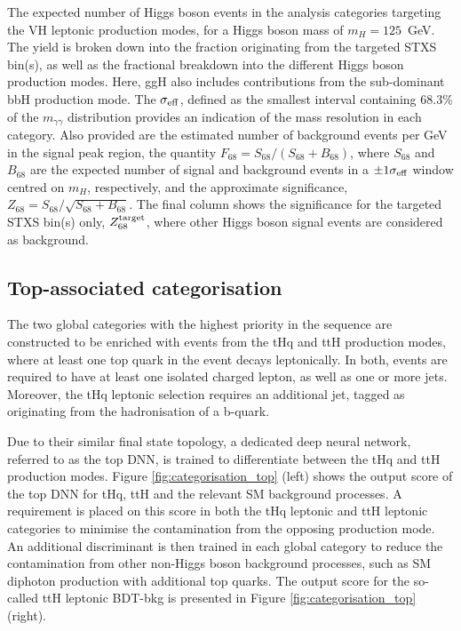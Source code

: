 \begin{table}[htb]
    \caption[Expected yields for the VH leptonic production mode categories]{The expected number of Higgs boson events in the analysis categories targeting the VH leptonic production modes, for a Higgs boson mass of $m_H=125$~GeV. The yield is broken down into the fraction originating from the targeted STXS bin(s), as well as the fractional breakdown into the different Higgs boson production modes. Here, ggH also includes contributions from the sub-dominant bbH production mode. The $\sigma_{\rm{eff}}$, defined as the smallest interval containing 68.3\% of the $m_{\gamma\gamma}$ distribution provides an indication of the mass resolution in each category. Also provided are the estimated number of background events per GeV in the signal peak region, the quantity $F_{68}=S_{68}/(S_{68}+B_{68})$, where $S_{68}$ and $B_{68}$ are the expected number of signal and background events in a $\pm1\sigma_{\rm{eff}}$ window centred on $m_H$, respectively, and the approximate significance, $Z_{68}=S_{68}/\sqrt{S_{68}+B_{68}}$. The final column shows the significance for the targeted STXS bin(s) only, $Z^{\rm{target}}_{68}$,  where other Higgs boson signal events are considered as background.}
    \label{tab:vhlep_category_yields}
    \centering
    \scriptsize
    \renewcommand{\arraystretch}{1.3}
    \setlength{\tabcolsep}{3pt}
    \hspace*{-1.5cm}
    
    \hspace*{-1.5cm}
\end{table}

\FloatBarrier

\subsection{Top-associated categorisation}
The two global categories with the highest priority in the sequence are constructed to be enriched with events from the tHq and ttH production modes, where at least one top quark in the event decays leptonically. In both, events are required to have at least one isolated charged lepton, as well as one or more jets. Moreover, the tHq leptonic selection requires an additional jet, tagged as originating from the hadronisation of a b-quark. 

Due to their similar final state topology, a dedicated deep neural network, referred to as the top DNN, is trained to differentiate between the tHq and ttH production modes. Figure \ref{fig:categorisation_top} (left) shows the output score of the top DNN for tHq, ttH and the relevant SM background processes. A requirement is placed on this score in both the tHq leptonic and ttH leptonic categories to minimise the contamination from the opposing production mode. An additional discriminant is then trained in each global category to reduce the contamination from other non-Higgs boson background processes, such as SM diphoton production with additional top quarks. The output score for the so-called ttH leptonic BDT-bkg is presented in Figure \ref{fig:categorisation_top} (right). 

